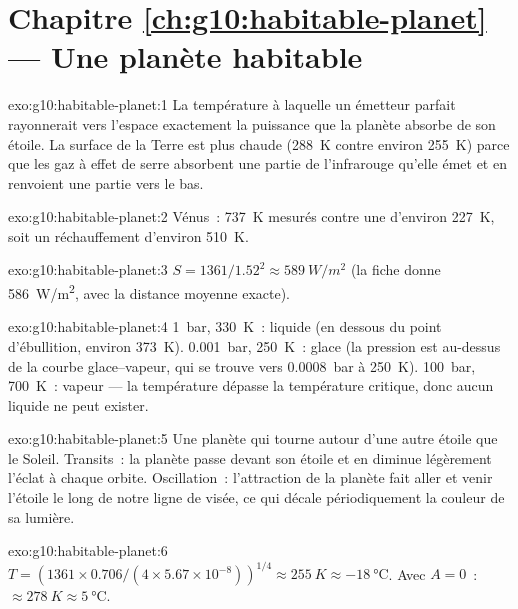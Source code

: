 \section*{Chapitre \ref{ch:g10:habitable-planet} --- Une planète habitable}

\begin{solution}{exo:g10:habitable-planet:1}
La température à laquelle un émetteur parfait rayonnerait vers l'espace
exactement la puissance que la planète absorbe de son étoile. La surface de
la Terre est plus chaude (\qty{288}{K} contre environ \qty{255}{K}) parce
que les gaz à effet de serre absorbent une partie de l'infrarouge qu'elle
émet et en renvoient une partie vers le bas.
\end{solution}

\begin{solution}{exo:g10:habitable-planet:2}
Vénus~: \qty{737}{K} mesurés contre une  d'environ
\qty{227}{K}, soit un réchauffement d'environ \qty{510}{K}.
\end{solution}

\begin{solution}{exo:g10:habitable-planet:3}
$S = 1361/1.52^2 \approx \qty{589}{W/m^2}$ (la fiche donne
\qty{586}{W/m^2}, avec la distance moyenne exacte).
\end{solution}

\begin{solution}{exo:g10:habitable-planet:4}
\qty{1}{bar}, \qty{330}{K}~: liquide (en dessous du point d'ébullition,
environ \qty{373}{K}). \qty{0.001}{bar}, \qty{250}{K}~: glace (la pression
est au-dessus de la courbe glace--vapeur, qui se trouve vers
\qty{0.0008}{bar} à \qty{250}{K}). \qty{100}{bar}, \qty{700}{K}~: vapeur
--- la température dépasse la température critique, donc aucun liquide ne
peut exister.
\end{solution}

\begin{solution}{exo:g10:habitable-planet:5}
Une planète qui tourne autour d'une autre étoile que le Soleil. Transits~:
la planète passe devant son étoile et en diminue légèrement l'éclat à
chaque orbite. Oscillation~: l'attraction de la planète fait aller et venir
l'étoile le long de notre ligne de visée, ce qui décale périodiquement la
couleur de sa lumière.
\end{solution}

\begin{solution}{exo:g10:habitable-planet:6}
$T = (1361 \times 0.706/(4 \times 5.67\times10^{-8}))^{1/4} \approx
\qty{255}{K} \approx \qty{-18}{\degreeCelsius}$. Avec $A = 0$~:
$\approx \qty{278}{K} \approx \qty{5}{\degreeCelsius}$.
\end{solution}

